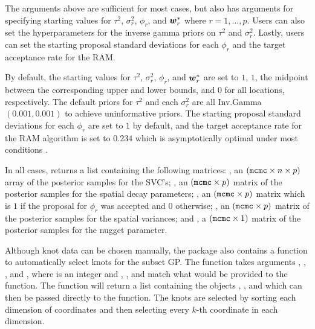 The arguments above are sufficient for most cases, but  also has arguments for specifying starting values for $\tau^2$, $\sigma_r^2$, $\phi_r$, and $\boldsymbol{w}_r^*$ where $r = 1, \dots, p$. Users can also set the hyperparameters for the inverse gamma priors on $\tau^2$ and $\sigma_r^2$. Lastly, users can set the starting proposal standard deviations for each $\phi_r$ and the target acceptance rate for the RAM.

By default, the starting values for $\tau^2$, $\sigma_r^2$, $\phi_r$, and $\boldsymbol{w}_r^*$ are set to $1$, $1$, the midpoint between the corresponding upper and lower bounds, and $0$ for all locations, respectively. The default priors for $\tau^2$ and each $\sigma_r^2$ are all Inv.Gamma$(0.001, 0.001)$ to achieve uninformative priors. The starting proposal standard deviations for each $\phi_r$ are set to $1$ by default, and the target acceptance rate for the RAM algorithm is set to $0.234$ which is asymptotically optimal under most conditions \citep{gelman}.

In all cases,  returns a list containing the following matrices: , an $(\texttt{mcmc} \times n \times p)$ array of the posterior samples for the SVC's; , an $(\texttt{mcmc} \times p)$ matrix of the posterior samples for the spatial decay parameters; , an $(\texttt{mcmc} \times p)$ matrix which is $1$ if the proposal for $\phi_r$ was accepted and $0$ otherwise; , an $(\texttt{mcmc} \times p)$ matrix of the posterior samples for the spatial variances; and , a $(\texttt{mcmc} \times 1)$ matrix of the posterior samples for the nugget parameter.

Although knot data can be chosen manually, the  package also contains a function  to automatically select knots for the subset GP. The function takes arguments , , , and , where  is an integer and , , and  match what would be provided to the  function. The function will return a list containing the objects , , and  which can then be passed directly to the  function. The knots are selected by sorting each dimension of coordinates and then selecting every $k$-th coordinate in each dimension.

